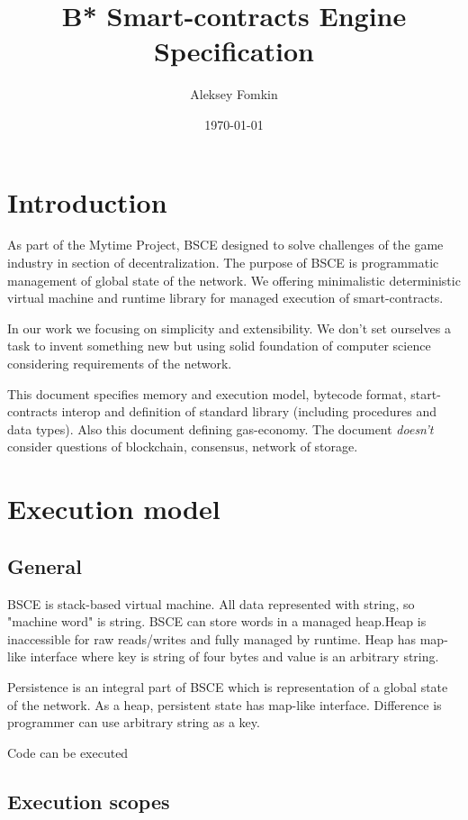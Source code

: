 \documentclass[12pt,a4paper]{article}
\title{B* Smart-contracts Engine Specification}
\author{Aleksey Fomkin}
\date{\today}
\begin{document}
\maketitle

\section{Introduction}

As part of the Mytime Project, BSCE designed to solve challenges of the game industry in section of decentralization. The purpose of BSCE is programmatic management of global state of the network. We offering minimalistic  deterministic virtual machine and runtime library for managed execution of smart-contracts.

In our work we focusing on simplicity and extensibility. We don't set ourselves a task to invent something new but using solid foundation of computer science considering requirements of the network.

This document specifies memory and execution model, bytecode format, start-contracts interop and definition of standard library (including procedures and data types). Also this document defining gas-economy. The document \textit{doesn't} consider questions of blockchain, consensus, network of storage. 

\section{Execution model}

\subsection{General}

BSCE is stack-based virtual machine. All data represented with string, so "machine word" is string. BSCE can store words in a managed heap.Heap is inaccessible for raw reads/writes and fully managed by runtime. Heap has map-like interface where key is string of four bytes and value is an arbitrary string. 

Persistence is an integral part of BSCE which is representation of a global state of the network. As a heap, persistent state has map-like interface. Difference is programmer can use arbitrary string as a key.

Code can be executed
\subsection{Execution scopes}
\end{document}
